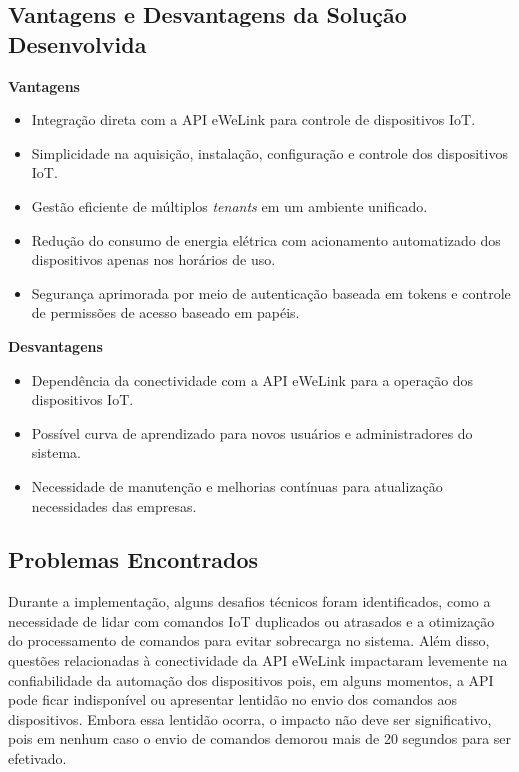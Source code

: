 \subsection{Vantagens e Desvantagens da Solução Desenvolvida}

\textbf{Vantagens}\\
\begin{itemize}
    \item Integração direta com a API eWeLink para controle de dispositivos IoT.
    \item Simplicidade na aquisição, instalação, configuração e controle dos dispositivos IoT. 
    \item Gestão eficiente de múltiplos \textit{tenants} em um ambiente unificado.
    \item Redução do consumo de energia elétrica com acionamento automatizado dos dispositivos apenas nos horários de uso.
    \item Segurança aprimorada por meio de autenticação baseada em tokens e controle de permissões de acesso baseado em papéis.
\end{itemize}

\textbf{Desvantagens}\\
\begin{itemize}
    \item Dependência da conectividade com a API eWeLink para a operação dos dispositivos IoT.
    \item Possível curva de aprendizado para novos usuários e administradores do sistema.
    \item Necessidade de manutenção e melhorias contínuas para atualização necessidades das empresas.
\end{itemize}

\subsection{Problemas Encontrados}

Durante a implementação, alguns desafios técnicos foram identificados, como a necessidade de lidar com comandos IoT duplicados ou atrasados e a otimização do processamento de comandos para evitar sobrecarga no sistema. Além disso, questões relacionadas à conectividade da API eWeLink impactaram levemente na confiabilidade da automação dos dispositivos pois, em alguns momentos, a API pode ficar indisponível ou apresentar lentidão no envio dos comandos aos dispositivos. Embora essa lentidão ocorra, o impacto não deve ser significativo, pois em nenhum caso o envio de comandos demorou mais de 20 segundos para ser efetivado.

